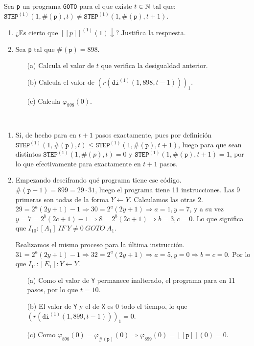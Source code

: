 \documentclass[twoside]{article}
\begin{document}
\begin{ejercicio}{18}
Sea \texttt{p} un programa \texttt{GOTO} para el que existe $t \in \mathbb{N}$ tal que:
$\texttt{STEP}^{(1)}(1, \#(\texttt{p}), t) \neq \texttt{STEP}^{(1)}(1, \#(\texttt{p}), t + 1)$.
\begin{enumerate}
\item ¿Es cierto que $[\![p]\!]^{(1)}(1) \downarrow$? Justifica la respuesta.
\item Sea \texttt{p} tal que $\#(\texttt{p}) = 898$.
\begin{itemize}
\item[(a)] Calcula el valor de $t$ que verifica la desigualdad anterior.
\item[(b)] Calcula el valor de $(r(\texttt{di}^{(1)}(1, 898, t - 1)))_1$.
\item[(c)] Calcula $\varphi_{898}(0)$.
\end{itemize}
\end{enumerate}
\end{ejercicio}
\begin{solucion}\
\begin{enumerate}
\item Sí, de hecho para en $t+1$ pasos exactamente, pues por definición $\texttt{STEP}^{(1)}(1, \#(\texttt{p}), t) \leq \texttt{STEP}^{(1)}(1, \#(\texttt{p}), t + 1)$, luego para que sean distintos $\texttt{STEP}^{(1)}(1, \#(p), t)=0$ y $\texttt{STEP}^{(1)}(1, \#(\texttt{p}), t + 1)=1$, por lo que efectivamente para exactamente en $t+1$ pasos. 
\item Empezando descifrando qué programa tiene ese código. $\#(\texttt{p}+1)=899=29\cdot 31$, luego el programa tiene 11 instrucciones. Las 9 primeras son todas de la forma $Y\leftarrow Y$. Calculamos las otras 2. $29=2^a(2y+1)-1\Rightarrow 30=2^a(2y+1)\Rightarrow a=1, y=7$, y a su vez $y=7=2^b(2c+1)-1\Rightarrow 8=2^b(2c+1)\Rightarrow b=3, c=0$. Lo que significa que $I_{10}: [A_1]\ IF\ Y\neq 0\ GOTO\ A_1$.

Realizamos el mismo proceso para la última instrucción. $31=2^a(2y+1)-1\Rightarrow 32=2^a(2y+1)\Rightarrow a=5, y=0\Rightarrow b=c=0$. Por lo que $I_{11}: [E_1]: Y\leftarrow Y$. 
\begin{itemize}
\item[(a)] Como el valor de \texttt{Y} permanece inalterado, el programa para en 11 pasos, por lo que $t=10$.
\item[(b)] El valor de \texttt{Y} y el de \texttt{X} es 0 todo el tiempo, lo que $(r(\texttt{di}^{(1)}(1, 899, t - 1)))_1=0$.
\item[(c)] Como $\varphi_{898}(0)=\varphi_{\#(\texttt{p})}(0)\Rightarrow\varphi_{899}(0)=[\![\texttt{p}]\!](0)=0$.
\end{itemize}
\end{enumerate}
\end{solucion}
\end{document}
